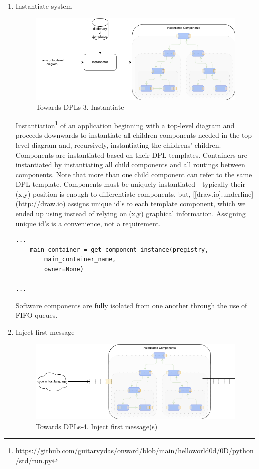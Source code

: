\documentclass[10pt]{acmart}
\begin{document}
\begin{enumerate}
\item Instantiate system
  \begin{figure}[h]
    \centering
    \includegraphics[width=0.8\linewidth]{./media/image4.png}
    \caption{Towards DPLs-3. Instantiate}
    \label{fig:instantiate_system}
  \end{figure}

  Instantiation\footnote{\url{https://github.com/guitarvydas/onward/blob/main/helloworld0d/0D/python/std/run.py}} of an application beginning with a top-level diagram
and proceeds downwards to instantiate all children components needed in
the top-level diagram and, recursively, instantiating the childrens'
children. Components are instantiated based on their DPL templates.
Containers are instantiated by instantiating all child components and
all routings between components. Note that more than one child component
can refer to the same DPL template. Components must be uniquely
instantiated - typically their (x,y) position is enough to differentiate
components, but, [[draw.io]{.underline}](http://draw.io) assigns unique
id's to each template component, which we ended up using instead of
relying on (x,y) graphical information. Assigning unique id's is a
convenience, not a requirement.


\begin{verbatim}
...
    main_container = get_component_instance(pregistry,
        main_container_name,
        owner=None)

...
\end{verbatim}

Software components are fully isolated from one another through the use
of FIFO queues.

\item Inject first message
  \begin{figure}[h]
    \centering
    \includegraphics[width=0.8\linewidth]{./media/image5.png}
    \caption{Towards DPLs-4. Inject first message(s)}
    \label{fig:inject_first_message}
  \end{figure}


\end{enumerate}
\end{document}
